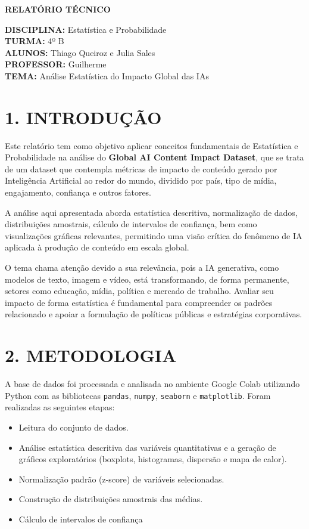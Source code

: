 \documentclass[12pt]{article}
\begin{document}
\begin{center}
\textbf{RELATÓRIO TÉCNICO}
\end{center}

\noindent\textbf{DISCIPLINA:} Estatística e Probabilidade \\
\noindent\textbf{TURMA:} 4º B \\
\noindent\textbf{ALUNOS:} Thiago Queiroz e Julia Sales \\
\noindent\textbf{PROFESSOR:} Guilherme \\
\noindent\textbf{TEMA:} Análise Estatística do Impacto Global das IAs  \\

\doublespacing

\section*{1. INTRODUÇÃO}

Este relatório tem como objetivo aplicar conceitos fundamentais de Estatística e Probabilidade na análise do \textbf{Global AI Content Impact Dataset}, que se trata de um dataset que contempla métricas de impacto de conteúdo gerado por Inteligência Artificial ao redor do mundo, dividido por país, tipo de mídia, engajamento, confiança e outros fatores.

A análise aqui apresentada aborda estatística descritiva, normalização de dados, distribuições amostrais, cálculo de intervalos de confiança, bem como visualizações gráficas relevantes, permitindo uma visão crítica do fenômeno de IA aplicada à produção de conteúdo em escala global.

O tema chama atenção devido a sua relevância, pois a IA generativa, como modelos de texto, imagem e vídeo, está transformando, de forma permanente, setores como educação, mídia, política e mercado de trabalho. Avaliar seu impacto de forma estatística é fundamental para compreender os padrões relacionado e apoiar a formulação de políticas públicas e estratégias corporativas.

\section*{2. METODOLOGIA}

A base de dados foi processada e analisada no ambiente Google Colab utilizando Python com as bibliotecas \texttt{pandas}, \texttt{numpy}, \texttt{seaborn} e \texttt{matplotlib}. Foram realizadas as seguintes etapas:

\begin{itemize}
    \item Leitura do conjunto de dados.
    \item  Análise estatística descritiva das variáveis quantitativas e a geração de gráficos exploratórios (boxplots, histogramas, dispersão e mapa de calor).
    \item Normalização padrão (z-score) de variáveis selecionadas.
    \item Construção de distribuições amostrais das médias.
    \item Cálculo de intervalos de confiança 
\end{itemize}
\end{document}
